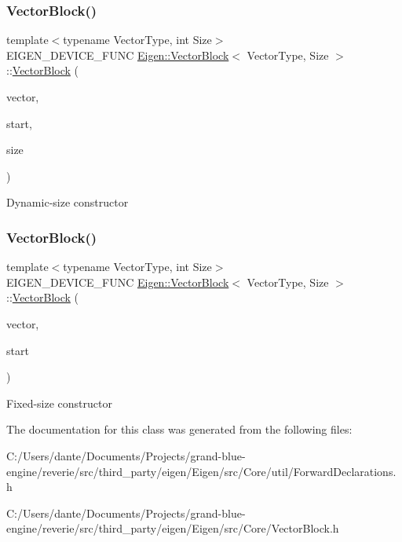 \subsubsection{\texorpdfstring{VectorBlock()}{VectorBlock()}\hspace{0.1cm}{\footnotesize\ttfamily [1/2]}}
{\footnotesize\ttfamily template$<$typename Vector\+Type, int Size$>$ \\
E\+I\+G\+E\+N\+\_\+\+D\+E\+V\+I\+C\+E\+\_\+\+F\+U\+NC \mbox{\hyperlink{class_eigen_1_1_vector_block}{Eigen\+::\+Vector\+Block}}$<$ Vector\+Type, Size $>$\+::\mbox{\hyperlink{class_eigen_1_1_vector_block}{Vector\+Block}} (\begin{DoxyParamCaption}\item[{Vector\+Type \&}]{vector,  }\item[{Index}]{start,  }\item[{Index}]{size }\end{DoxyParamCaption})\hspace{0.3cm}{\ttfamily [inline]}}

Dynamic-\/size constructor \mbox{\label{class_eigen_1_1_vector_block_a94bcec1eda40d989b2fbcc70f343fa8f}} 
\subsubsection{\texorpdfstring{VectorBlock()}{VectorBlock()}\hspace{0.1cm}{\footnotesize\ttfamily [2/2]}}
{\footnotesize\ttfamily template$<$typename Vector\+Type, int Size$>$ \\
E\+I\+G\+E\+N\+\_\+\+D\+E\+V\+I\+C\+E\+\_\+\+F\+U\+NC \mbox{\hyperlink{class_eigen_1_1_vector_block}{Eigen\+::\+Vector\+Block}}$<$ Vector\+Type, Size $>$\+::\mbox{\hyperlink{class_eigen_1_1_vector_block}{Vector\+Block}} (\begin{DoxyParamCaption}\item[{Vector\+Type \&}]{vector,  }\item[{Index}]{start }\end{DoxyParamCaption})\hspace{0.3cm}{\ttfamily [inline]}}

Fixed-\/size constructor 

The documentation for this class was generated from the following files\+:\begin{DoxyCompactItemize}
\item 
C\+:/\+Users/dante/\+Documents/\+Projects/grand-\/blue-\/engine/reverie/src/third\+\_\+party/eigen/\+Eigen/src/\+Core/util/Forward\+Declarations.\+h\item 
C\+:/\+Users/dante/\+Documents/\+Projects/grand-\/blue-\/engine/reverie/src/third\+\_\+party/eigen/\+Eigen/src/\+Core/Vector\+Block.\+h\end{DoxyCompactItemize}
